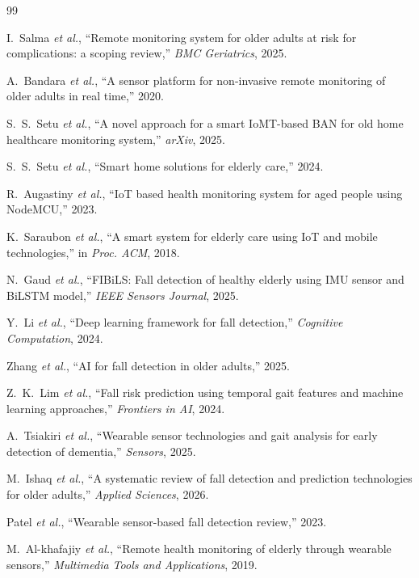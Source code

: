 \documentclass[conference]{IEEEtran}
\begin{document}
\balance

\begin{thebibliography}{99}

I.~Salma \textit{et al.}, ``Remote monitoring system for older adults at risk for complications: a scoping review,'' \textit{BMC Geriatrics}, 2025.

A.~Bandara \textit{et al.}, ``A sensor platform for non-invasive remote monitoring of older adults in real time,'' 2020.

S.~S.~Setu \textit{et al.}, ``A novel approach for a smart IoMT-based BAN for old home healthcare monitoring system,'' \textit{arXiv}, 2025.

S.~S.~Setu \textit{et al.}, ``Smart home solutions for elderly care,'' 2024.

R.~Augastiny \textit{et al.}, ``IoT based health monitoring system for aged people using NodeMCU,'' 2023.

K.~Saraubon \textit{et al.}, ``A smart system for elderly care using IoT and mobile technologies,'' in \textit{Proc. ACM}, 2018.

N.~Gaud \textit{et al.}, ``FIBiLS: Fall detection of healthy elderly using IMU sensor and BiLSTM model,'' \textit{IEEE Sensors Journal}, 2025.

Y.~Li \textit{et al.}, ``Deep learning framework for fall detection,'' \textit{Cognitive Computation}, 2024.

Zhang \textit{et al.}, ``AI for fall detection in older adults,'' 2025.

Z.~K.~Lim \textit{et al.}, ``Fall risk prediction using temporal gait features and machine learning approaches,'' \textit{Frontiers in AI}, 2024.

A.~Tsiakiri \textit{et al.}, ``Wearable sensor technologies and gait analysis for early detection of dementia,'' \textit{Sensors}, 2025.

M.~Ishaq \textit{et al.}, ``A systematic review of fall detection and prediction technologies for older adults,'' \textit{Applied Sciences}, 2026.

Patel \textit{et al.}, ``Wearable sensor-based fall detection review,'' 2023.

M.~Al-khafajiy \textit{et al.}, ``Remote health monitoring of elderly through wearable sensors,'' \textit{Multimedia Tools and Applications}, 2019.


\end{thebibliography}
\end{document}
